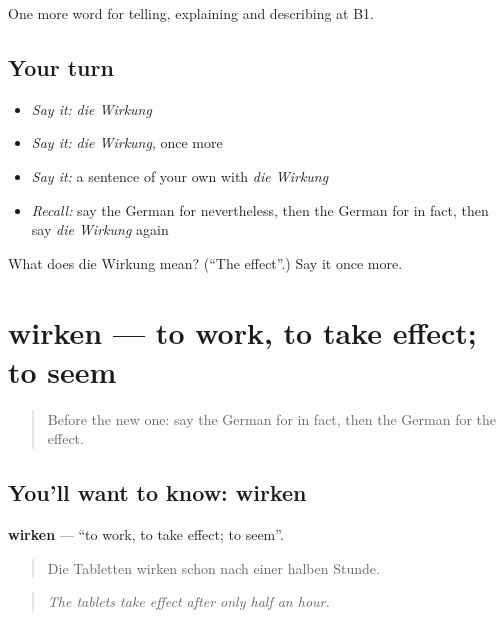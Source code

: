 \begin{grammarlens}[title={What you've built}]
One more word for telling, explaining and describing at B1.
\end{grammarlens}

\subsection*{Your turn}
\begin{itemize}
\raggedright
  \item \emph{Say it:} \emph{die Wirkung}
  \item \emph{Say it:} \emph{die Wirkung}, once more
  \item \emph{Say it:} a sentence of your own with \emph{die Wirkung}
  \item \emph{Recall:} say the German for nevertheless, then the German for in fact, then say \emph{die Wirkung} again
\end{itemize}

\begin{tcolorbox}[breakable,colback=teal!4,colframe=teal!35!black,title={Before you move on}]
What does die Wirkung mean? (\textquotedblleft{}The effect\textquotedblright{}.) Say it once more.
\end{tcolorbox}
\section[wirken]{wirken — to work, to take effect; to seem}

\label{lesson:GE-C342-wirken}



\begin{quote}
Before the new one: say the German for in fact, then the German for the effect.
\end{quote}

\subsection*{You'll want to know: wirken}
\textbf{wirken} — \textquotedblleft{}to work, to take effect; to seem\textquotedblright{}.

\begin{quote}
Die Tabletten wirken schon nach einer halben Stunde.
\end{quote}

\begin{quote}
\emph{The tablets take effect after only half an hour.}
\end{quote}

